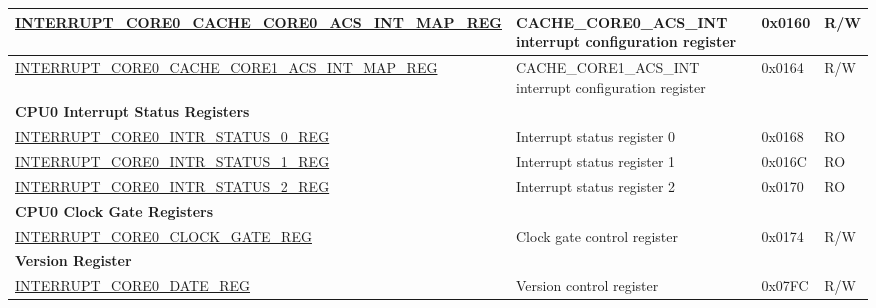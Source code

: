 \begin{landscape}
\begin{longtable}{ | p{10cm} | p{10.2cm} | p{1.3cm} | p{1cm} | }
\hyperref[regdesc:INTERRUPTCORE0CACHECORE0ACSINTMAPREG]{INTERRUPT\_CORE0\_CACHE\_CORE0\_ACS\_INT\_MAP\_REG} & CACHE\_CORE0\_ACS\_INT interrupt configuration register & 0x0160 & R/W \\ \hline
\hyperref[regdesc:INTERRUPTCORE0CACHECORE1ACSINTMAPREG]{INTERRUPT\_CORE0\_CACHE\_CORE1\_ACS\_INT\_MAP\_REG} & CACHE\_CORE1\_ACS\_INT interrupt configuration register & 0x0164 & R/W \\ \hline
\multicolumn{4}{|l|}{\textbf{CPU0 Interrupt Status Registers}} \\ \hline
\hyperref[regdesc:INTERRUPTCORE0INTRSTATUS0REG]{INTERRUPT\_CORE0\_INTR\_STATUS\_0\_REG} & Interrupt status register 0 & 0x0168 & RO \\ \hline
\hyperref[regdesc:INTERRUPTCORE0INTRSTATUS1REG]{INTERRUPT\_CORE0\_INTR\_STATUS\_1\_REG} & Interrupt status register 1 & 0x016C & RO \\ \hline
\hyperref[regdesc:INTERRUPTCORE0INTRSTATUS2REG]{INTERRUPT\_CORE0\_INTR\_STATUS\_2\_REG} & Interrupt status register 2 & 0x0170 & RO \\ \hline
\multicolumn{4}{|l|}{\textbf{CPU0 Clock Gate Registers}} \\ \hline
\hyperref[regdesc:INTERRUPTCORE0CLOCKGATEREG]{INTERRUPT\_CORE0\_CLOCK\_GATE\_REG} & Clock gate control register & 0x0174 & R/W \\ \hline
\multicolumn{4}{|l|}{\textbf{Version Register}} \\ \hline
\hyperref[regdesc:INTERRUPTCORE0DATEREG]{INTERRUPT\_CORE0\_DATE\_REG} & Version control register & 0x07FC & R/W \\ \hline
\end{longtable}


\end{landscape}
